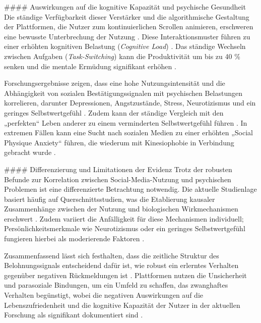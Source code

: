 \documentclass[11pt,a4paper]{article}
\begin{document}
\#\#\#\# Auswirkungen auf die kognitive Kapazität und psychische Gesundheit Die ständige Verfügbarkeit dieser Verstärker und die algorithmische Gestaltung der Plattformen, die Nutzer zum kontinuierlichen Scrollen animieren, erschweren eine bewusste Unterbrechung der Nutzung \autocite{grey_grey_3467cac0f11d4b1e86319128da218a3e}. Diese Interaktionsmuster führen zu einer erhöhten kognitiven Belastung (\textit{Cognitive Load}) \autocite{grey_grey_d4bc9c0d0e8441ba90398520e73af07d}. Das ständige Wechseln zwischen Aufgaben (\textit{Task-Switching}) kann die Produktivität um bis zu 40 \% senken und die mentale Ermüdung signifikant erhöhen \autocite{grey_grey_d4bc9c0d0e8441ba90398520e73af07d}.

Forschungsergebnisse zeigen, dass eine hohe Nutzungsintensität und die Abhängigkeit von sozialen Bestätigungssignalen mit psychischen Belastungen korrelieren, darunter Depressionen, Angstzustände, Stress, Neurotizismus und ein geringes Selbstwertgefühl \autocite{doaj_10febcbb5e60420699a1d4570a075832,openalex_W2924664363}. Zudem kann der ständige Vergleich mit den „perfekten“ Leben anderer zu einem verminderten Selbstwertgefühl führen \autocite{grey_grey_3467cac0f11d4b1e86319128da218a3e,grey_grey_f99abd6bfbd04efc8def60bb6988ce35}. In extremen Fällen kann eine Sucht nach sozialen Medien zu einer erhöhten „Social Physique Anxiety“ führen, die wiederum mit Kinesiophobie in Verbindung gebracht wurde \autocite{crossref_10_3389_fpsyg_2026_1840700}.

\#\#\#\# Differenzierung und Limitationen der Evidenz Trotz der robusten Befunde zur Korrelation zwischen Social-Media-Nutzung und psychischen Problemen ist eine differenzierte Betrachtung notwendig. Die aktuelle Studienlage basiert häufig auf Querschnittsstudien, was die Etablierung kausaler Zusammenhänge zwischen der Nutzung und biologischen Wirkmechanismen erschwert \autocite{openalex_W2924664363,crossref_10_3389_fpsyg_2026_1840700}. Zudem variiert die Anfälligkeit für diese Mechanismen individuell; Persönlichkeitsmerkmale wie Neurotizismus oder ein geringes Selbstwertgefühl fungieren hierbei als moderierende Faktoren \autocite{doaj_10febcbb5e60420699a1d4570a075832}.

Zusammenfassend lässt sich festhalten, dass die zeitliche Struktur des Belohnungssignals entscheidend dafür ist, wie robust ein erlerntes Verhalten gegenüber negativen Rückmeldungen ist \autocite{crossref_10_3758_bf03343141}. Plattformen nutzen die Unsicherheit und parasoziale Bindungen, um ein Umfeld zu schaffen, das zwanghaftes Verhalten begünstigt, wobei die negativen Auswirkungen auf die Lebenszufriedenheit und die kognitive Kapazität der Nutzer in der aktuellen Forschung als signifikant dokumentiert sind \autocite{doaj_10febcbb5e60420699a1d4570a075832,grey_grey_d4bc9c0d0e8441ba90398520e73af07d}.
\end{document}

